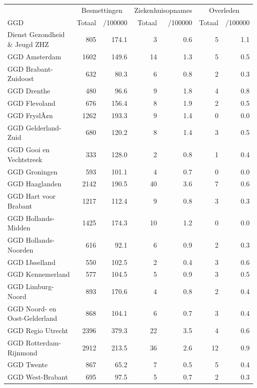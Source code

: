 \documentclass[
  english,
  man,floatsintext]{apa6}
\begin{document}
\begin{table}
\centering\begingroup\fontsize{10}{12}\selectfont

\begin{threeparttable}
\begin{tabular}{lrrrrrr}
\toprule
\multicolumn{1}{c}{ } & \multicolumn{2}{c}{Besmettingen} & \multicolumn{2}{c}{Ziekenhuisopnames} & \multicolumn{2}{c}{Overleden} \\
\cmidrule(l{3pt}r{3pt}){2-3} \cmidrule(l{3pt}r{3pt}){4-5} \cmidrule(l{3pt}r{3pt}){6-7}
GGD & Totaal & /100000 & Totaal & /100000 & Totaal & /100000\\
\midrule
Dienst Gezondheid \& Jeugd ZHZ & 805 & 174.1 & 3 & 0.6 & 5 & 1.1\\
GGD Amsterdam & 1602 & 149.6 & 14 & 1.3 & 5 & 0.5\\
GGD Brabant-Zuidoost & 632 & 80.3 & 6 & 0.8 & 2 & 0.3\\
GGD Drenthe & 480 & 96.6 & 9 & 1.8 & 4 & 0.8\\
GGD Flevoland & 676 & 156.4 & 8 & 1.9 & 2 & 0.5\\
GGD FryslÃ¢n & 1262 & 193.3 & 9 & 1.4 & 0 & 0.0\\
GGD Gelderland-Zuid & 680 & 120.2 & 8 & 1.4 & 3 & 0.5\\
GGD Gooi en Vechtstreek & 333 & 128.0 & 2 & 0.8 & 1 & 0.4\\
GGD Groningen & 593 & 101.1 & 4 & 0.7 & 0 & 0.0\\
GGD Haaglanden & 2142 & 190.5 & 40 & 3.6 & 7 & 0.6\\
GGD Hart voor Brabant & 1217 & 112.4 & 9 & 0.8 & 3 & 0.3\\
GGD Hollands-Midden & 1425 & 174.3 & 10 & 1.2 & 0 & 0.0\\
GGD Hollands-Noorden & 616 & 92.1 & 6 & 0.9 & 2 & 0.3\\
GGD IJsselland & 550 & 102.5 & 2 & 0.4 & 3 & 0.6\\
GGD Kennemerland & 577 & 104.5 & 5 & 0.9 & 3 & 0.5\\
GGD Limburg-Noord & 893 & 170.6 & 4 & 0.8 & 2 & 0.4\\
GGD Noord- en Oost-Gelderland & 868 & 104.1 & 6 & 0.7 & 3 & 0.4\\
GGD Regio Utrecht & 2396 & 379.3 & 22 & 3.5 & 4 & 0.6\\
GGD Rotterdam-Rijnmond & 2912 & 213.5 & 36 & 2.6 & 12 & 0.9\\
GGD Twente & 867 & 65.2 & 7 & 0.5 & 5 & 0.4\\
GGD West-Brabant & 695 & 97.5 & 5 & 0.7 & 2 & 0.3\\

\end{tabular}
\end{threeparttable}
\end{table}
\end{document}
